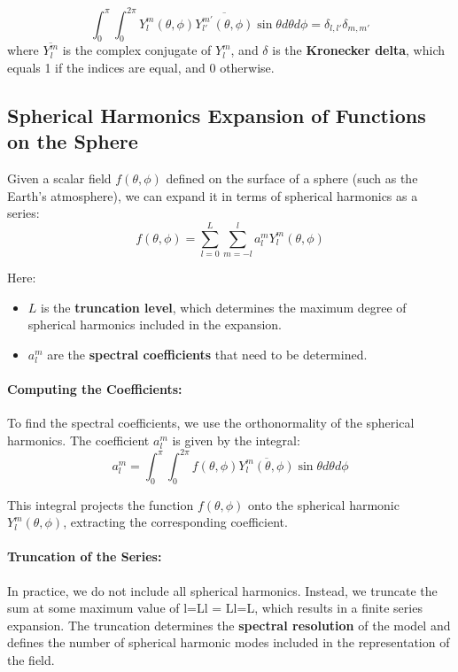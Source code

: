 $$\int_0^{\pi}\int_0^{2\pi}Y_l^m(\theta, \phi)\overline{Y_{l'}^{m'}(\theta,\phi)}\sin\theta d\theta d\phi=\delta_{l,l'}\delta_{m,m'}$$ where $\overline{Y_l^m}$
is the complex conjugate of $Y_l^m$, and $\delta$ is the \textbf{Kronecker delta}, which equals 1 if the indices are equal, and 0 otherwise.

\subsection{Spherical Harmonics Expansion of Functions on the Sphere}

Given a scalar field $f(\theta,\phi)$ defined on the surface of a sphere (such as the Earth's atmosphere), we can expand it in terms of spherical harmonics as a series:
\[f(\theta,\phi)=\displaystyle\sum_{l=0}^L\displaystyle\sum_{m=-l}^{l}a_l^mY_l^m(\theta,\phi)\]

Here:

\begin{itemize}
	\item $L$ is the \textbf{truncation level}, which determines the maximum degree of spherical harmonics included in the expansion.
	\item $a_l^m$ are the \textbf{spectral coefficients} that need to be determined.
\end{itemize}

\paragraph{\textbf{Computing the Coefficients}:}

To find the spectral coefficients, we use the orthonormality of the spherical harmonics. The coefficient $a_l^m$ is given by the integral:
\[
	a_l^m=\int_0^\pi\int_0^{2\pi}f(\theta,\phi)\overline{Y_l^m(\theta,\phi)}\sin\theta d\theta d\phi
\]

This integral projects the function $f(\theta,\phi)$ onto the spherical harmonic $Y_l^m(\theta,\phi)$, extracting the corresponding coefficient.

\paragraph{\textbf{Truncation of the Series}:}

In practice, we do not include all spherical harmonics. Instead, we truncate the sum at some maximum value of l=Ll = Ll=L, which results in a finite series expansion. The truncation determines the \textbf{spectral resolution} of the model and defines the number of spherical harmonic modes included in the representation of the field.

